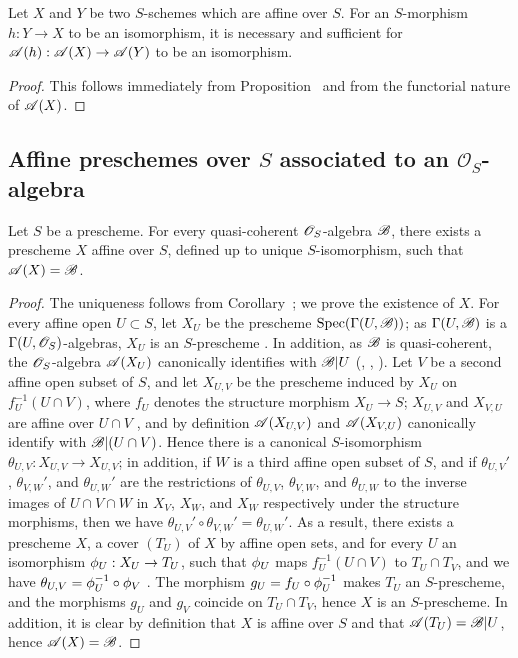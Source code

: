 \begin{corollary}[1.2.8]
\label{II.1.2.8}
Let $X$ and $Y$ be two $S$-schemes which are affine over $S$.
For an $S$-morphism $h:Y\to X$ to be an isomorphism, it is necessary and sufficient for $\sh{A}(h):\sh{A}(X)\to\sh{A}(Y)$ to be an isomorphism.
\end{corollary}

\begin{proof}
This follows immediately from Proposition~ and from the functorial nature of $\mathscr{A}(X)$.
\end{proof}

\subsection{Affine preschemes over $S$ associated to an $\mathcal{O}_S$-algebra}
\label{subsection:II.1.3}

\begin{proposition}[1.3.1]
\label{II.1.3.1}
Let $S$ be a prescheme.
For every quasi-coherent $\mathscr{O}_S$-algebra $\mathscr{B}$, there exists a prescheme $X$ affine over $S$, defined up to unique $S$-isomorphism, such that $\mathscr{A}(X)=\mathscr{B}$.
\end{proposition}

\begin{proof}
The uniqueness follows from Corollary~; we prove the existence of $X$.
For every affine open $U\subset S$, let $X_U$ be the prescheme $\operatorname{Spec}(\Gamma(U,\mathscr{B}))$; as $\Gamma(U,\mathscr{B})$ is a $\Gamma(U,\mathscr{O}_S)$-algebras, $X_U$ is an $S$-prescheme .
In addition, as $\mathscr{B}$ is quasi-coherent, the $\mathscr{O}_S$-algebra $\mathscr{A}(X_U)$ canonically identifies with $\mathscr{B}|U$ (, , ).
Let $V$ be a second affine open subset of $S$, and let $X_{U,V}$ be the prescheme induced by $X_U$ on $f_U^{-1}(U\cap V)$, where $f_U$ denotes the structure morphism $X_U\to S$; $X_{U,V}$ and $X_{V,U}$ are affine over $U\cap V$ , and by definition $\mathscr{A}(X_{U,V})$ and $\mathscr{A}(X_{V,U})$ canonically identify with $\mathscr{B}|(U\cap V)$.
Hence there is  a canonical $S$-isomorphism $\theta_{U,V}:X_{U,V}\to X_{U,V}$; in addition, if $W$ is a third affine open subset of $S$, and if $\theta_{U,V}'$, $\theta_{V,W}'$, and $\theta_{U,W}'$ are the restrictions of $\theta_{U,V}$, $\theta_{V,W}$, and $\theta_{U,W}$ to the inverse images of $U\cap V\cap W$ in $X_V$, $X_W$, and $X_W$ respectively under the structure morphisms, then we have $\theta_{U,V}'\circ\theta_{V,W}'=\theta_{U,W}'$.
As a result, there exists a prescheme $X$, a cover $(T_U)$ of $X$ by affine open sets, and for every $U$ an isomorphism $\vphi_U:X_U\to T_U$, such that $\phi_U$ maps $f_U^{-1}(U\cap V)$ to $T_U\cap T_V$, and we have $\theta_{U,V}=\phi_U^{-1}\circ\phi_V$ .
The morphism $g_U=f_U\circ\phi_U^{-1}$ makes $T_U$ an $S$-prescheme, and the morphisms $g_U$ and $g_V$ coincide on $T_U\cap T_V$, hence $X$ is an $S$-prescheme.
In addition, it is clear by definition that $X$ is affine over $S$ and that $\mathscr{A}(T_U)=\mathscr{B}|U$, hence $\mathscr{A}(X)=\mathscr{B}$.
\end{proof}

